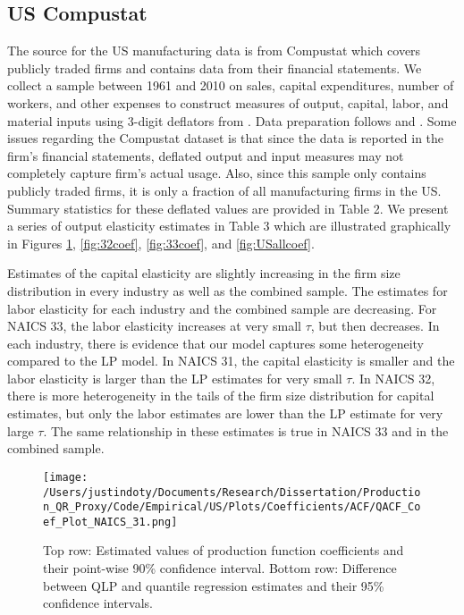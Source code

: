 \documentclass[11pt]{article}
\begin{document}
\subsection{US Compustat}
The source for the US manufacturing data is from Compustat which covers publicly traded firms and contains data from their financial statements. We collect a sample between 1961 and 2010 on sales, capital expenditures, number of workers, and other expenses to construct measures of output, capital, labor, and material inputs using 3-digit deflators from \cite{nber}. Data preparation follows \cite{Keller2009} and \cite{mert}. Some issues regarding the Compustat dataset is that since the data is reported in the firm's financial statements, deflated output and input measures may not completely capture firm's actual usage. Also, since this sample only contains publicly traded firms, it is only a fraction of all manufacturing firms in the US. Summary statistics for these deflated values are provided in Table 2. We present a series of output elasticity estimates in Table 3 which are illustrated graphically in Figures \ref{fig:31coef}, \ref{fig:32coef}, \ref{fig:33coef}, and \ref{fig:USallcoef}.

Estimates of the capital elasticity are slightly increasing in the firm size distribution in every industry as well as the combined sample. The estimates for labor elasticity for each industry and the combined sample are decreasing. For NAICS 33, the labor elasticity increases at very small $\tau$, but then decreases. In each industry, there is evidence that our model captures some heterogeneity compared to the LP model. In NAICS 31, the capital elasticity is smaller and the labor elasticity is larger than the LP estimates for very small $\tau$. In NAICS 32, there is more heterogeneity in the tails of the firm size distribution for capital estimates, but only the labor estimates are lower than the LP estimate for very large $\tau$. The same relationship in these estimates is true in NAICS 33 and in the combined sample.

\begin{figure}[H]
\centering
\texttt{[image: /Users/justindoty/Documents/Research/Dissertation/Production\_QR\_Proxy/Code/Empirical/US/Plots/Coefficients/ACF/QACF\_Coef\_Plot\_NAICS\_31.png]}
\caption{Top row: Estimated values of production function coefficients and their point-wise 90\% confidence interval. Bottom row: Difference between QLP and quantile regression estimates and their 95\% confidence intervals.}
\label{fig:31coef}
\end{figure}
\end{document}
